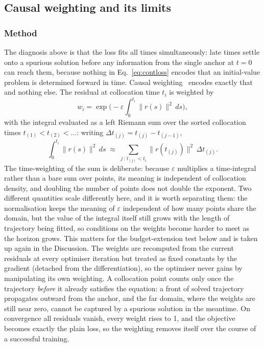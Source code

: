 \documentclass[11pt,a4paper]{article}
\begin{document}
\subsection{Causal weighting and its limits}
\label{sec:causal}

\subsubsection{Method}

The diagnosis above is that the loss fits all times simultaneously: late
times settle onto a spurious solution before any information from the
single anchor at $t = 0$ can reach them, because nothing in
Eq.~\eqref{eq:contloss} encodes that an initial-value problem is determined
forward in time. Causal weighting~\cite{wang2024causal} encodes exactly
that and nothing else. The residual at collocation time $t_i$ is weighted
by
\begin{equation}
  w_i = \exp\!\Big(-\varepsilon \int_0^{t_i} \lVert r(s)\rVert^2 \, ds\Big),
  \label{eq:causal}
\end{equation}
with the integral evaluated as a left Riemann sum over the sorted
collocation times $t_{(1)} < t_{(2)} < \dots$: writing
$\Delta t_{(j)} = t_{(j)} - t_{(j-1)}$,
\begin{equation*}
  \int_0^{t_i} \lVert r(s)\rVert^2 \, ds \;\approx\;
  \sum_{j\,:\,t_{(j)} < t_i} \big\lVert r(t_{(j)}) \big\rVert^2\,
  \Delta t_{(j)} .
\end{equation*}
The time-weighting of the sum is deliberate: because $\varepsilon$
multiplies a time-integral rather than a bare sum over points, its
meaning is independent of collocation density, and doubling
the number of points does not double the exponent. Two different
quantities scale differently here, and it is worth separating them: the
normalisation keeps the meaning of $\varepsilon$ independent of how many
points share the domain, but the value of the integral itself still grows
with the length of trajectory being fitted, so conditions on the weights
become harder to meet as the horizon grows. This matters for the
budget-extension test below and is taken up again in the Discussion. The
weights are recomputed from the current residuals at every optimiser
iteration but treated as fixed constants by the gradient (detached from
the differentiation), so the optimiser never gains by manipulating its
own weighting. A collocation
point counts only once the trajectory \emph{before} it already satisfies
the equation: a front of solved trajectory propagates outward from the
anchor, and the far domain, where the weights are still near zero, cannot
be captured by a spurious solution in the meantime. On convergence all
residuals vanish, every weight rises to 1, and the objective becomes
exactly the plain loss, so the weighting removes itself over the course
of a successful training.
\end{document}

